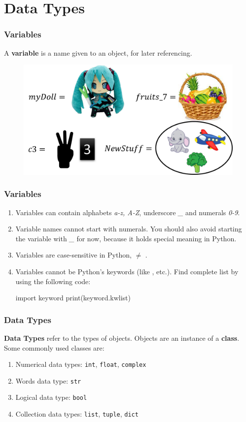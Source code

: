 \documentclass{beamer}
\begin{document}
\section{Data Types}

\begin{frame}
\frametitle{Variables}
A \textbf{variable} is a name given to an object, for later referencing.
\begin{figure}[H]
\centering
\includegraphics[width=\textwidth]{images/0_variables-examples.png}
\end{figure}
\end{frame}

\begin{frame}[fragile]
\frametitle{Variables}
\begin{enumerate}
\item Variables can contain alphabets \emph{a-z, A-Z}, underscore \emph{\_} and numerals \emph{0-9}.
\item Variable names cannot start with numerals. You should also avoid starting the variable with \emph{\_} for now, because it holds special meaning in Python.
\item Variables are case-sensitive in Python,  $\ne$ .
\item Variables cannot be Python's keywords (like , etc.). Find complete list by using the following code:
\begin{python}
import keyword
print(keyword.kwlist)
\end{python}
\end{enumerate}
\end{frame}

\begin{frame}
\frametitle{Data Types}
\textbf{Data Types} refer to the types of objects. Objects are an instance of a \textbf{class}. Some commonly used classes are:
\begin{enumerate}
\item Numerical data types: \lstinline{int}, \lstinline{float}, \lstinline{complex}
\item Words data type: \lstinline{str}
\item Logical data type: \lstinline{bool}
\item Collection data types: \lstinline{list}, \lstinline{tuple}, \lstinline{dict}
\end{enumerate}
\end{frame}
\end{document}
